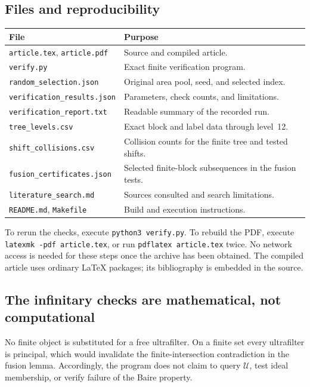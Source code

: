 \documentclass[11pt,a4paper]{article}
\theoremstyle{definition}
\theoremstyle{remark}
\newcommand{\U}{\mathcal U}
\begin{document}
\subsection{Files and reproducibility}
\begin{center}
\small
\begin{tabular}{@{}p{}p{}@{}}
\toprule
File & Purpose\\
\midrule
\texttt{article.tex}, \texttt{article.pdf} & Source and compiled article.\\
\texttt{verify.py} & Exact finite verification program.\\
\texttt{random\_selection.json} & Original area pool, seed, and selected index.\\
\texttt{verification\_results.json} & Parameters, check counts, and limitations.\\
\texttt{verification\_report.txt} & Readable summary of the recorded run.\\
\texttt{tree\_levels.csv} & Exact block and label data through level~12.\\
\texttt{shift\_collisions.csv} & Collision counts for the finite tree and tested shifts.\\
\texttt{fusion\_certificates.json} & Selected finite-block subsequences in the fusion tests.\\
\texttt{literature\_search.md} & Sources consulted and search limitations.\\
\texttt{README.md}, \texttt{Makefile} & Build and execution instructions.\\
\bottomrule
\end{tabular}
\end{center}

To rerun the checks, execute \texttt{python3 verify.py}. To rebuild the
PDF, execute \texttt{latexmk -pdf article.tex}, or run
\texttt{pdflatex article.tex} twice. No network access is needed for
these steps once the archive has been obtained. The compiled article
uses ordinary LaTeX packages; its bibliography is embedded in the
source.

\subsection{The infinitary checks are mathematical, not computational}
No finite object is substituted for a free ultrafilter. On a finite
set every ultrafilter is principal, which would invalidate the
finite-intersection contradiction in the fusion lemma. Accordingly,
the program does not claim to query $\U$, test ideal membership, or
verify failure of the Baire property.
\end{document}
